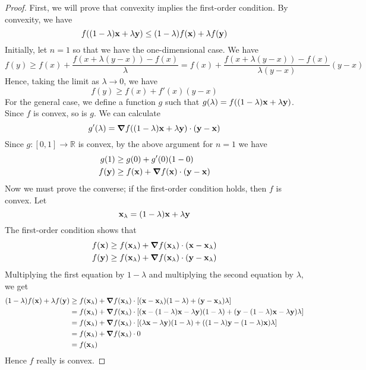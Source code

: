 \begin{proof}
	First, we will prove that convexity implies the first-order condition.
	By convexity, we have
	\[
		f\qty((1-\lambda)\vb x + \lambda \vb y) \leq (1-\lambda)f(\vb x) + \lambda f(\vb y)
	\]
	Initially, let \(n=1\) so that we have the one-dimensional case.
	We have
	\[
		f(y) \geq f(x) + \frac{f(x + \lambda(y-x)) - f(x)}{\lambda} = f(x) + \frac{f(x + \lambda(y-x)) - f(x)}{\lambda(y-x)}(y-x)
	\]
	Hence, taking the limit as \(\lambda \to 0\), we have
	\[
		f(y) \geq f(x) + f'(x)(y-x)
	\]
	For the general case, we define a function \(g\) such that \(g(\lambda) = f((1-\lambda)\vb x + \lambda\vb y)\).
	Since \(f\) is convex, so is \(g\).
	We can calculate
	\[
		g'(\lambda) = \grad{f((1-\lambda)\vb x + \lambda\vb y)} \cdot (\vb y - \vb x)
	\]
	Since \(g \colon [0, 1] \to \mathbb R\) is convex, by the above argument for \(n = 1\) we have
	\begin{align*}
		g(1)     & \geq g(0) + g'(0) (1-0)                               \\
		f(\vb y) & \geq f(\vb x) + \grad{f(\vb x)} \cdot (\vb y - \vb x)
	\end{align*}
	Now we must prove the converse; if the first-order condition holds, then \(f\) is convex.
	Let
	\[
		\vb x_\lambda = (1-\lambda)\vb x + \lambda \vb y
	\]
	The first-order condition shows that
	\begin{align*}
		f(\vb x) & \geq f(\vb x_\lambda) + \grad{f(\vb x_\lambda)} \cdot (\vb x - \vb x_\lambda) \\
		f(\vb y) & \geq f(\vb x_\lambda) + \grad{f(\vb x_\lambda)} \cdot (\vb y - \vb x_\lambda)
	\end{align*}
	Multiplying the first equation by \(1-\lambda\) and multiplying the second equation by \(\lambda\), we get
	\begin{align*}
		(1-\lambda)f(\vb x) + \lambda f(\vb y) & \geq f(\vb x_\lambda) + \grad{f(\vb x_\lambda)} \cdot \qty[(\vb x - \vb x_\lambda)(1-\lambda) + (\vb y - \vb x_\lambda)\lambda]                                    \\
		                                       & = f(\vb x_\lambda) + \grad{f(\vb x_\lambda)} \cdot \qty[(\vb x - (1-\lambda)\vb x - \lambda \vb y)(1-\lambda) + (\vb y - (1-\lambda)\vb x - \lambda \vb y)\lambda] \\
		                                       & = f(\vb x_\lambda) + \grad{f(\vb x_\lambda)} \cdot \qty[(\lambda \vb x - \lambda \vb y)(1-\lambda) + ((1-\lambda)\vb y - (1-\lambda) \vb x)\lambda]                \\
		                                       & = f(\vb x_\lambda) + \grad{f(\vb x_\lambda)} \cdot 0                                                                                                               \\
		                                       & = f(\vb x_\lambda)
	\end{align*}
	Hence \(f\) really is convex.
\end{proof}

